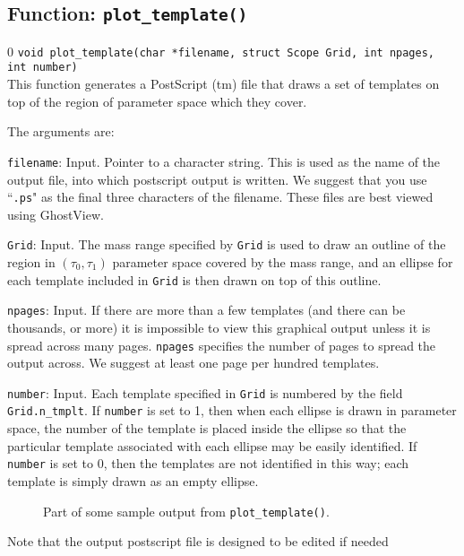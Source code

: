 \subsection{Function: {\tt plot\_template()}}
\setcounter{equation}0
{\tt void plot\_template(char *filename, struct Scope Grid, int npages, int number)}\\
This function generates a PostScript (tm) file that draws a set of templates
on top of the region of parameter space which they cover.

The arguments are:
\begin{description}
\item{\tt filename}: Input.  Pointer to a character string.  This is used as
  the name of the output file, into which postscript output is
  written.  We suggest that you use ``{\tt .ps}" as the final three
  characters of the filename.  These files
  are best viewed using GhostView.
\item{\tt Grid}:  Input.  The mass range specified by {\tt Grid} is used to
  draw an outline of the region in $(\tau_0,\tau_1)$ parameter space
  covered by the mass range, and an ellipse for each template included
  in {\tt Grid} is then drawn on top of this outline.
\item{\tt npages}: Input.  If there are more than a few templates (and
  there can be thousands, or more) it is impossible to view this
  graphical output unless it is spread across many pages.  {\tt npages}
  specifies the number of pages to spread the output across.  We suggest at
  least one page per hundred templates.
\item{\tt number}: Input.  Each template specified in {\tt Grid} is
  numbered by the field {\tt Grid.n\_tmplt}.  If {\tt number} is set to
  1, then when each ellipse is drawn in parameter space, the number of
  the template is placed inside the ellipse so that the particular
  template associated with each ellipse may be easily identified.  If
  {\tt number} is set to 0, then the templates are not identified in
  this way; each template is simply drawn as an empty ellipse.
\end{description}
\begin{figure}[h]
\begin{center}
\caption{ \label{f:plotexample} Part of some sample output from {\tt plot\_template()}. }
\end{center}
\end{figure}
Note that the output postscript file is designed to be edited if needed
